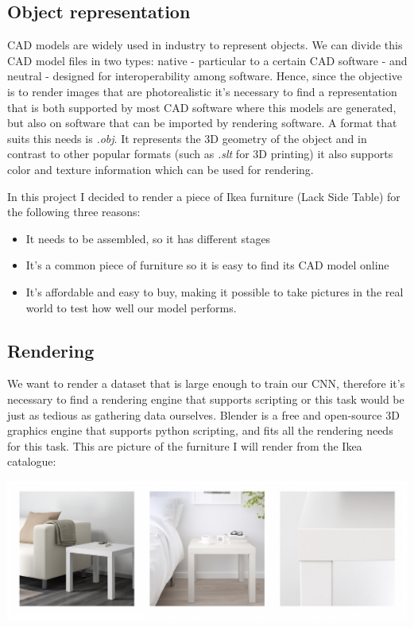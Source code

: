 \documentclass[10pt,a4paper]{article}
\begin{document}
\subsection{Object representation}
CAD models are widely used in industry to represent objects. We can divide this CAD model files in two types: native - particular to a certain CAD software - and neutral - designed for interoperability among software. Hence, since the objective is to render images that are photorealistic it's necessary to find a representation that is both supported by most CAD software where this models are generated, but also on software that can be imported by rendering software. A format that suits this needs is \textit{.obj}. It represents the 3D geometry of the object and in contrast to other popular formats (such as \textit{.slt} for 3D printing) it also supports color and texture information which can be used for rendering\cite{objspec}.

In this project I decided to render a piece of Ikea furniture (Lack Side Table)\cite{lacktable} for the following three reasons:
\begin{itemize}
\item It needs to be assembled, so it has different stages
\item It's a common piece of furniture so it is easy to find its CAD model online
\item It's affordable and easy to buy,  making it possible to take pictures in the real world to test how well our model performs.
\end{itemize}

\subsection{Rendering}
We want to render a dataset that is large enough to train our CNN, therefore it's necessary to find a rendering engine that supports scripting or this task would be just as tedious as gathering data ourselves. Blender is a free and open-source 3D graphics engine that supports python scripting, and fits all the rendering needs for this task. This are picture of the furniture I will render from the Ikea catalogue:

\includegraphics[scale=0.45]{table_3}
\end{document}
